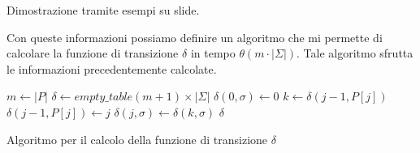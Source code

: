 \begin{nota}
    Dimostrazione tramite esempi su slide.
\end{nota}
Con queste informazioni possiamo definire un algoritmo che mi permette di calcolare
la funzione di transizione $\delta$ in tempo $\theta(m \cdot |\Sigma|)$. Tale
algoritmo sfrutta le informazioni precedentemente calcolate.
\begin{algorithm}[!ht]
    \begin{algorithmic}
        \State $m\gets |P|$
        \State $\delta \gets empty\_table (m + 1) \times | \Sigma|$
        \For{$\sigma \in \Sigma$}
        \State $\delta(0, \sigma) \gets 0$
        \EndFor
        \State $k \gets \delta(j - 1, P[j])$
        \State $\delta(j - 1, P[j]) \gets j$
        \For{$\sigma \in \Sigma$}
        \State $\delta(j, \sigma) \gets \delta(k, \sigma)$
        \EndFor
        \EndFor
        \State \Return $\delta$
        \EndFunction
    \end{algorithmic}
    \caption{Algoritmo per il calcolo della funzione di transizione $\delta$}
\end{algorithm}
